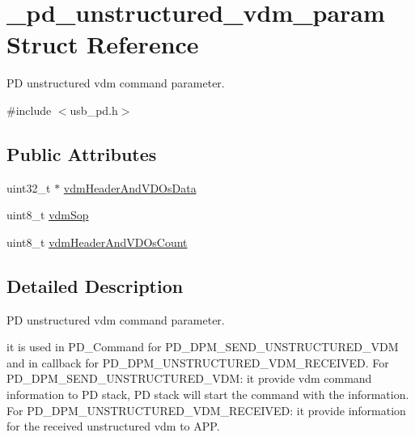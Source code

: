 \hypertarget{struct__pd__unstructured__vdm__param}{\section{\-\_\-pd\-\_\-unstructured\-\_\-vdm\-\_\-param Struct Reference}
\label{struct__pd__unstructured__vdm__param}
}


P\-D unstructured vdm command parameter.  




{\ttfamily \#include $<$usb\-\_\-pd.\-h$>$}

\subsection*{Public Attributes}
\begin{DoxyCompactItemize}
\item 
uint32\-\_\-t $\ast$ \hyperlink{struct__pd__unstructured__vdm__param_ace459022833c093044261a805aca67ac}{vdm\-Header\-And\-V\-D\-Os\-Data}
\item 
uint8\-\_\-t \hyperlink{struct__pd__unstructured__vdm__param_a842d85782a56f40375590061c9e2003c}{vdm\-Sop}
\item 
uint8\-\_\-t \hyperlink{struct__pd__unstructured__vdm__param_a7efceddd48daf429c447c7c7108c9066}{vdm\-Header\-And\-V\-D\-Os\-Count}
\end{DoxyCompactItemize}


\subsection{Detailed Description}
P\-D unstructured vdm command parameter. 

it is used in P\-D\-\_\-\-Command for P\-D\-\_\-\-D\-P\-M\-\_\-\-S\-E\-N\-D\-\_\-\-U\-N\-S\-T\-R\-U\-C\-T\-U\-R\-E\-D\-\_\-\-V\-D\-M and in callback for P\-D\-\_\-\-D\-P\-M\-\_\-\-U\-N\-S\-T\-R\-U\-C\-T\-U\-R\-E\-D\-\_\-\-V\-D\-M\-\_\-\-R\-E\-C\-E\-I\-V\-E\-D. For P\-D\-\_\-\-D\-P\-M\-\_\-\-S\-E\-N\-D\-\_\-\-U\-N\-S\-T\-R\-U\-C\-T\-U\-R\-E\-D\-\_\-\-V\-D\-M\-: it provide vdm command information to P\-D stack, P\-D stack will start the command with the information. For P\-D\-\_\-\-D\-P\-M\-\_\-\-U\-N\-S\-T\-R\-U\-C\-T\-U\-R\-E\-D\-\_\-\-V\-D\-M\-\_\-\-R\-E\-C\-E\-I\-V\-E\-D\-: it provide information for the received unstructured vdm to A\-P\-P. 

